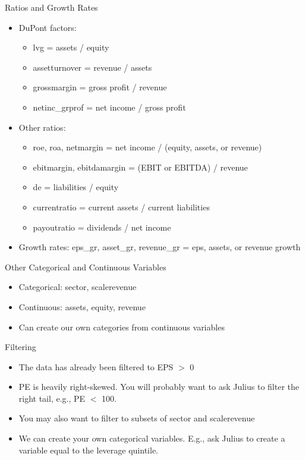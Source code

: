 \documentclass[10pt]{beamer}
\begin{document}
\begin{frame}{Ratios and Growth Rates}
\begin{itemize}
  \item DuPont factors:
  \begin{itemize}
    \item lvg = assets / equity
 \item assetturnover = revenue / assets
 \item grossmargin = gross profit / revenue
 \item netinc\_grprof = net income / gross profit
  \end{itemize}
  \item Other ratios:
  \begin{itemize}
\item roe, roa, netmargin = net income / (equity, assets, or revenue)
\item ebitmargin, ebitdamargin = (EBIT or EBITDA) / revenue
\item de = liabilities / equity
\item currentratio = current assets / current liabilities
\item payoutratio = dividends / net income
\end{itemize}
\item Growth rates: eps\_gr, asset\_gr, revenue\_gr = eps, assets, or revenue growth
\end{itemize}
\end{frame}

\begin{frame}{Other Categorical and Continuous Variables}
\begin{itemize}
\item Categorical: sector, scalerevenue
\item Continuous: assets, equity, revenue
\item Can create our own categories from continuous variables 
\end{itemize}
\end{frame}

\begin{frame}{Filtering}
  \begin{itemize}
    \item The data has already been filtered to EPS $>$ 0
    \item PE is heavily right-skewed.  You will probably want to ask Julius to filter the right tail, e.g., PE $<$ 100.
    \item You may also want to filter to subsets of sector and scalerevenue
    \item We can create your own categorical variables.  E.g., ask Julius to create a variable equal to the leverage quintile.
  \end{itemize}
\end{frame}
\end{document}

